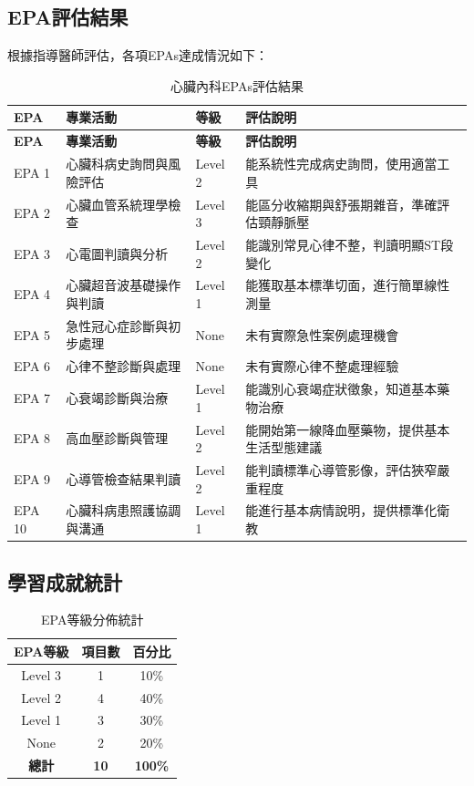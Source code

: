 \documentclass[12pt,a4paper]{article}
\begin{document}
\subsection{EPA評估結果}

根據指導醫師評估，各項EPAs達成情況如下：

\begin{longtable}{|p{1cm}|p{6cm}|p{2cm}|p{5cm}|}
\caption{心臟內科EPAs評估結果} \\
\hline
\textbf{EPA} & \textbf{專業活動} & \textbf{等級} & \textbf{評估說明} \\
\hline
\endfirsthead
\hline
\textbf{EPA} & \textbf{專業活動} & \textbf{等級} & \textbf{評估說明} \\
\hline
\endhead

EPA 1 & 心臟科病史詢問與風險評估 & Level 2 & 能系統性完成病史詢問，使用適當工具 \\
\hline
EPA 2 & 心臟血管系統理學檢查 & Level 3 & 能區分收縮期與舒張期雜音，準確評估頸靜脈壓 \\
\hline  
EPA 3 & 心電圖判讀與分析 & Level 2 & 能識別常見心律不整，判讀明顯ST段變化 \\
\hline
EPA 4 & 心臟超音波基礎操作與判讀 & Level 1 & 能獲取基本標準切面，進行簡單線性測量 \\
\hline
EPA 5 & 急性冠心症診斷與初步處理 & None & 未有實際急性案例處理機會 \\
\hline
EPA 6 & 心律不整診斷與處理 & None & 未有實際心律不整處理經驗 \\
\hline
EPA 7 & 心衰竭診斷與治療 & Level 1 & 能識別心衰竭症狀徵象，知道基本藥物治療 \\
\hline
EPA 8 & 高血壓診斷與管理 & Level 2 & 能開始第一線降血壓藥物，提供基本生活型態建議 \\
\hline
EPA 9 & 心導管檢查結果判讀 & Level 2 & 能判讀標準心導管影像，評估狹窄嚴重程度 \\
\hline
EPA 10 & 心臟科病患照護協調與溝通 & Level 1 & 能進行基本病情說明，提供標準化衛教 \\
\hline
\end{longtable}

\subsection{學習成就統計}

\begin{table}[h]
\centering
\caption{EPA等級分佈統計}
\begin{tabular}{|c|c|c|}
\hline
\textbf{EPA等級} & \textbf{項目數} & \textbf{百分比} \\
\hline
Level 3 & 1 & 10\% \\
Level 2 & 4 & 40\% \\
Level 1 & 3 & 30\% \\
None & 2 & 20\% \\
\hline
\textbf{總計} & \textbf{10} & \textbf{100\%} \\
\hline
\end{tabular}
\end{table}
\end{document}
